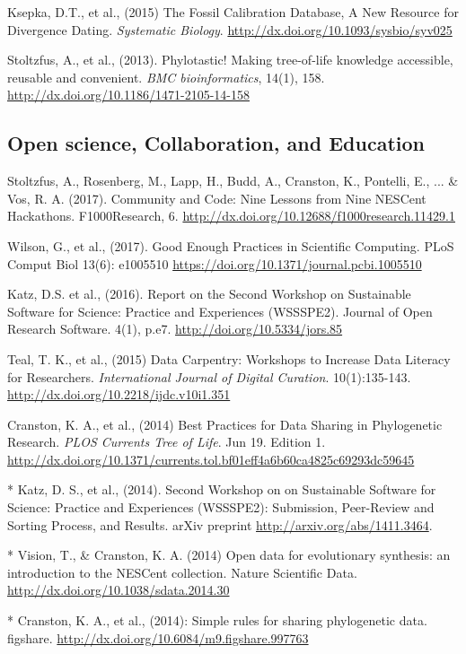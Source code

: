 \documentclass[10pt]{article}
\begin{document}
Ksepka, D.T., et al., (2015) The Fossil Calibration Database, A New Resource for Divergence Dating. \textit{Systematic Biology}. \url{http://dx.doi.org/10.1093/sysbio/syv025}

Stoltzfus, A., et al., (2013). Phylotastic! Making tree-of-life knowledge accessible, reusable and convenient. \textit{BMC bioinformatics}, 14(1), 158. \url{http://dx.doi.org/10.1186/1471-2105-14-158} 

\subsection*{Open science, Collaboration, and Education}
Stoltzfus, A., Rosenberg, M., Lapp, H., Budd, A., Cranston, K., Pontelli, E., ... \& Vos, R. A. (2017). Community and Code: Nine Lessons from Nine NESCent Hackathons. F1000Research, 6. \url{http://dx.doi.org/10.12688/f1000research.11429.1}

Wilson, G., et al., (2017). Good Enough Practices in Scientific Computing. PLoS Comput Biol 13(6): e1005510 \url{https://doi.org/10.1371/journal.pcbi.1005510}

Katz, D.S. et al., (2016). Report on the Second Workshop on Sustainable Software for Science: Practice and Experiences (WSSSPE2). Journal of Open Research Software. 4(1), p.e7. \url{http://doi.org/10.5334/jors.85}

Teal, T. K., et al., (2015) Data Carpentry: Workshops to Increase Data Literacy for Researchers. \textit{International Journal of Digital Curation}. 10(1):135-143. \url{http://dx.doi.org/10.2218/ijdc.v10i1.351}
 
Cranston, K. A., et al., (2014) Best Practices for Data Sharing in Phylogenetic Research. \textit{PLOS Currents Tree of Life}. Jun 19. Edition 1. \\
\url{http://dx.doi.org/10.1371/currents.tol.bf01eff4a6b60ca4825c69293dc59645} 

* Katz, D. S., et al., (2014). Second Workshop on on Sustainable Software for Science: Practice and Experiences (WSSSPE2): Submission, Peer-Review and Sorting Process, and Results. arXiv preprint \url{http://arxiv.org/abs/1411.3464}.

* Vision, T., \& Cranston, K. A. (2014) Open data for evolutionary synthesis: an introduction to the NESCent collection. Nature Scientific Data. \url{http://dx.doi.org/10.1038/sdata.2014.30}

* Cranston, K. A., et al., (2014): Simple rules for sharing phylogenetic data. figshare. \url{http://dx.doi.org/10.6084/m9.figshare.997763}
\end{document}
